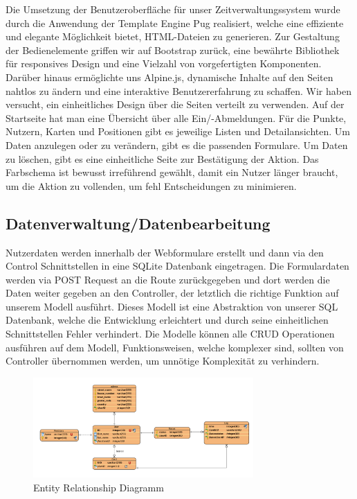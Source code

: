 \documentclass[../main.tex]{subfiles}
\begin{document}
Die Umsetzung der Benutzeroberfläche für unser Zeitverwaltungssystem wurde durch die Anwendung der Template Engine Pug realisiert, welche eine effiziente und elegante Möglichkeit bietet, HTML-Dateien zu generieren. Zur Gestaltung der Bedienelemente griffen wir auf Bootstrap zurück, eine bewährte Bibliothek für responsives Design und eine Vielzahl von vorgefertigten Komponenten. Darüber hinaus ermöglichte uns Alpine.js, dynamische Inhalte auf den Seiten nahtlos zu ändern und eine interaktive Benutzererfahrung zu schaffen. 
Wir haben versucht, ein einheitliches Design über die Seiten verteilt zu verwenden. Auf der Startseite hat man eine Übersicht über alle Ein/-Abmeldungen. Für die Punkte, Nutzern, Karten und Positionen gibt es jeweilige Listen und Detailansichten. Um Daten anzulegen oder zu verändern, gibt es die passenden Formulare. Um Daten zu löschen, gibt es eine einheitliche Seite zur Bestätigung der Aktion. Das Farbschema ist bewusst irreführend gewählt, damit ein Nutzer länger braucht, um die Aktion zu vollenden, um fehl Entscheidungen zu minimieren.

\subsection{Datenverwaltung/Datenbearbeitung}

Nutzerdaten werden innerhalb der Webformulare erstellt und dann via den Control Schnittstellen in eine SQLite Datenbank eingetragen. Die Formulardaten werden via POST Request an die Route zurückgegeben und dort werden die Daten weiter gegeben an den Controller, der letztlich die richtige Funktion auf unserem Modell ausführt. Dieses Modell ist eine Abstraktion von unserer SQL Datenbank, welche die Entwicklung erleichtert und durch seine einheitlichen Schnittstellen Fehler verhindert. Die Modelle können alle CRUD Operationen ausführen auf dem Modell, Funktionsweisen, welche komplexer sind, sollten von Controller übernommen werden, um unnötige Komplexität zu verhindern.

\begin{figure}[!ht]
    \centering
    \includegraphics[width=0.75\textwidth]{images/Datenbank Modell.png}
    \caption{Entity Relationship Diagramm}
    \label{fig:ER}
    \centering
\end{figure}
\end{document}
